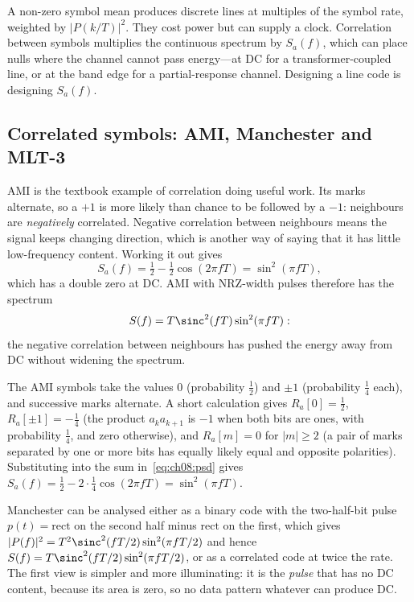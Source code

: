 \begin{keyidea}
A non-zero symbol mean produces discrete lines at multiples of the symbol rate, weighted by
$|P(k/T)|^2$. They cost power but can supply a clock. Correlation between symbols multiplies
the continuous spectrum by $S_a(f)$, which can place nulls where the channel cannot pass
energy---at DC for a transformer-coupled line, or at the band edge for a partial-response
channel. Designing a line code is designing $S_a(f)$.
\end{keyidea}

\subsection{Correlated symbols: AMI, Manchester and MLT-3}

AMI is the textbook example of correlation doing useful work. Its marks alternate, so a $+1$
is more likely than chance to be followed by a $-1$: neighbours are \emph{negatively}
correlated. Negative correlation between neighbours means the signal keeps changing direction,
which is another way of saying that it has little low-frequency content. Working it out gives
\begin{equation}
S_a(f)=\tfrac12-\tfrac12\cos(2\pi fT)=\sin^2(\pi fT),
\end{equation}
which has a double zero at DC. AMI with NRZ-width pulses therefore has the spectrum
\[
S(f)=T\sinc^2(fT)\sin^2(\pi fT):
\]
the negative correlation between neighbours has pushed the energy away from DC without
widening the spectrum.

\begin{deeper}
The AMI symbols take the values $0$ (probability $\tfrac12$) and $\pm1$ (probability
$\tfrac14$ each), and successive marks alternate. A short calculation gives $R_a[0]=\tfrac12$,
$R_a[\pm1]=-\tfrac14$ (the product $a_ka_{k+1}$ is $-1$ when both bits are ones, with
probability $\frac14$, and zero otherwise), and $R_a[m]=0$ for $|m|\ge2$ (a pair of marks
separated by one or more bits has equally likely equal and opposite polarities).
Substituting into the sum in~\eqref{eq:ch08:psd} gives
$S_a(f)=\tfrac12-2\cdot\tfrac14\cos(2\pi fT)=\sin^2(\pi fT)$.
\end{deeper}

Manchester can be analysed either as a binary code with the two-half-bit pulse
$p(t)=\mathrm{rect}$ on the second half minus $\mathrm{rect}$ on the first, which gives
$|P(f)|^2=T^2\sinc^2(fT/2)\sin^2(\pi fT/2)$ and hence
$S(f)=T\sinc^2(fT/2)\sin^2(\pi fT/2)$, or as a correlated code at twice the rate. The first
view is simpler and more illuminating: it is the \emph{pulse} that has no DC content, because
its area is zero, so no data pattern whatever can produce DC.

